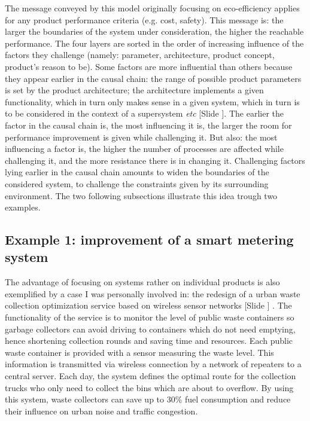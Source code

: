 \documentclass{article}
\newcounter{slide}
\begin{document}
The message conveyed by this model originally focusing on eco-efficiency applies for any product performance criteria (e.g. cost, safety). This message is: the larger the boundaries of the system under consideration, the higher the reachable performance. The four layers are sorted in the order of increasing influence of the factors they challenge (namely: parameter, architecture, product concept, product's reason to be). Some factors are more influential than others because they appear earlier in the causal chain: the range of possible product parameters is set by the product architecture; the architecture implements a given functionality, which in turn only makes sense in a given system, which in turn is to be considered in the context of a supersystem \emph{etc} {\color{blue}[Slide ]}. The earlier the factor in the causal chain is, the most influencing it is, the larger the room for performance improvement is given while challenging it. But also: the most influencing a factor is, the higher the number of processes are affected while challenging it, and the more resistance there is in changing it. Challenging factors lying earlier in the causal chain amounts to widen the boundaries of the considered system, to challenge the constraints given by its surrounding environment. The two following subsections illustrate this idea trough two examples. 

\subsection{Example 1: improvement of a smart metering system}
\label{sec:smartcity}
The advantage of focusing on systems rather on individual products is also exemplified by a case I was personally involved in: the redesign of a urban waste collection optimization service based on wireless sensor networks {\color{blue}[Slide ]} \cite{bonvoisinAnalyseEnvironnementaleEcoconception2012}. The functionality of the service is to monitor the level of public waste containers so garbage collectors can avoid driving to containers which do not need emptying, hence shortening collection rounds and saving time and resources. Each public waste container is provided with a sensor measuring the waste level. This information is transmitted via wireless connection by a network of repeaters to a central server. Each day, the system defines the optimal route for the collection trucks who only need to collect the bins which are about to overflow. By using this system, waste collectors can save up to 30\% fuel consumption and reduce their influence on urban noise and traffic congestion. 
\end{document}
